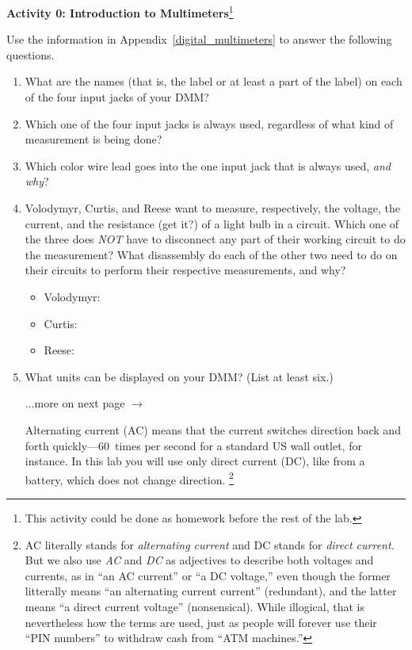 \medskip

\textbf{Activity 0: Introduction to Multimeters}\footnote{This activity could be done as homework before the rest of the lab.}

Use the information in Appendix~\ref{digital_multimeters} to answer the following questions.

\begin{enumerate}[labparts]

\item What are the names (that is, the label or at least a part of the label) on each of the four input jacks of your DMM?
\answerspace{0.3in}

\item Which one of the four input jacks is always used, regardless of what kind of measurement is being done?
\answerspace{0.3in}

\item Which color wire lead goes into the one input jack that is always used, \textit{and why}?
\answerspace{0.6in}

\item Volodymyr, Curtis, and Reese want to measure, respectively, the voltage, the current, and the resistance (get it?) of a light bulb in a circuit.  Which one of the three does \textit{NOT} have to disconnect any part of their working circuit to do the measurement? What disassembly do each of the other two need to do on their circuits to perform their respective measurements, and why?
\begin{itemize}[itemsep = 0.1in]
\item Volodymyr: 

\item Curtis: 

\item Reese: 
\end{itemize}

\item What units can be displayed on your DMM?  (List at least six.)
\answerspace{0.4in}

\hspace{\fill}...more on next page $\longrightarrow$

\pagebreak
Alternating current (AC) means that the current switches direction back and forth quickly---60~times per second for a standard US wall outlet, for instance.  In this lab you will use only direct current (DC), like from a battery, which does not change direction.%
\footnote{AC literally stands for \textit{alternating current} and DC stands for \textit{direct current.} But we also use \textit{AC} and \textit{DC} as adjectives to describe both voltages and currents, as in ``an AC current'' or ``a DC voltage,'' even though the former litterally means ``an alternating current current'' (redundant), and the latter  means ``a direct current voltage'' (nonsensical).  While illogical, that is nevertheless how the terms are used, just as people will forever use their ``PIN numbers'' to withdraw cash from ``ATM machines.''}


\end{enumerate}
